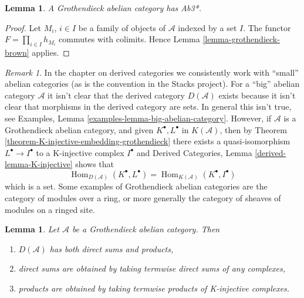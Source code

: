 \documentclass{stacks-project}
\theoremstyle{plain}
\newtheorem{lemma}[subsection]{Lemma}
\theoremstyle{definition}
\theoremstyle{remark}
\newtheorem{remark}[subsection]{Remark}
\numberwithin{equation}{subsection}
\def\Hom{\mathop{\mathrm{Hom}}\nolimits}
\begin{document}
\begin{lemma}
\label{lemma-grothendieck-products}
A Grothendieck abelian category has Ab3*.
\end{lemma}

\begin{proof}
Let $M_i$, $i \in I$ be a family of objects of $\mathcal{A}$ indexed
by a set $I$. The functor $F = \prod_{i \in I} h_{M_i}$
commutes with colimits. Hence
Lemma \ref{lemma-grothendieck-brown}
applies.
\end{proof}

\begin{remark}
\label{remark-existence-D}
In the chapter on derived categories we consistently work with
``small'' abelian categories (as is the convention in the Stacks
project). For a ``big'' abelian category $\mathcal{A}$ it isn't clear
that the derived category $D(\mathcal{A})$ exists because it isn't
clear that morphisms in the derived category are sets. In general this
isn't true, see
Examples, Lemma \ref{examples-lemma-big-abelian-category}.
However, if $\mathcal{A}$ is a Grothendieck abelian category, and given
$K^\bullet, L^\bullet$ in $K(\mathcal{A})$, then by
Theorem \ref{theorem-K-injective-embedding-grothendieck}
there exists a quasi-isomorphism $L^\bullet \to I^\bullet$ to a
K-injective complex $I^\bullet$ and
Derived Categories, Lemma \ref{derived-lemma-K-injective} shows that
$$
\Hom_{D(\mathcal{A})}(K^\bullet, L^\bullet) =
\Hom_{K(\mathcal{A})}(K^\bullet, I^\bullet)
$$
which is a set. Some examples of Grothendieck abelian categories
are the category of modules over a ring, or more generally
the category of sheaves of modules on a ringed site.
\end{remark}

\begin{lemma}
\label{lemma-derived-products}
Let $\mathcal{A}$ be a Grothendieck abelian category.
Then
\begin{enumerate}
\item $D(\mathcal{A})$ has both direct sums and products,
\item direct sums are obtained by taking termwise direct sums of
any complexes,
\item products are obtained by taking termwise products of
K-injective complexes.
\end{enumerate}
\end{lemma}
\end{document}
